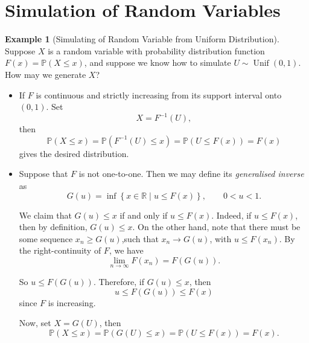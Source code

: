 \documentclass[11pt]{article}
\numberwithin{equation}{section}
\theoremstyle{definition}
\newtheorem{example}[theorem]{Example}
\theoremstyle{remark}
\newcommand{\pqty}[1]{\left(#1\right)}
\newcommand{\set}[2]{\left\{#1\mid #2\right\}}
\newcommand{\oointv}[2]{(#1,#2)}
\newcommand{\RR}{\mathbb R}
\newcommand{\inverse}{^{-1}}
\newcommand{\Prob}{\mathbb P}
\newcommand{\Uniform}{\operatorname{Unif}}
\begin{document}
\section{Simulation of Random Variables}\label{probability-section-15}

\begin{example}[Simulating of Random Variable from Uniform Distribution]\label{probability-example-046}
    \label{probability-ex:simulation-from-uniform}%
    Suppose \(X\) is a random variable with probability distribution function \(F\pqty{x} = \Prob\pqty{X \leq x}\), and suppose we know how to simulate \(U \sim \Uniform \oointv{0}{1}\). How may we generate \(X\)?

    \begin{itemize}
        \item If \(F\) is continuous and strictly increasing from its support interval onto \((0,1)\). Set
        \[
            X = F\inverse\pqty{U},
        \]
        then
        \[
            \Prob\pqty{X \leq x} = \Prob\pqty{F\inverse\pqty{U} \leq x} = \Prob\pqty{U \leq F\pqty{x}} = F\pqty{x}
        \]
        gives the desired distribution.

        \item Suppose that \(F\) is not one-to-one. Then we may define its \emph{generalised inverse} as
        \[
            G\pqty{u} = \inf \set{x \in \RR}{u \leq F\pqty{x}},\qquad 0<u<1.
        \]

        We claim that \(G\pqty{u} \leq x\) if and only if \(u \leq F\pqty{x}\). Indeed, if \(u \leq F\pqty{x}\), then by definition, \(G\pqty{u} \leq x\). On the other hand, note that there must be some sequence \(x_n \geq G\pqty{u}\),such that \(x_n \to G\pqty{u}\), with \(u \leq F\pqty{x_n}\). By the right-continuity of \(F\), we have
        \[
            \lim_{n \to \infty} F\pqty{x_n} = F\pqty{G\pqty{u}}.
        \]

        So \(u \leq F\pqty{G\pqty{u}}\). Therefore, if \(G\pqty{u} \leq x\), then
        \[
            u \leq F\pqty{G\pqty{u}} \leq F\pqty{x}
        \]
        since \(F\) is increasing.

        Now, set \(X = G\pqty{U}\), then
        \[
            \Prob\pqty{X \leq x} = \Prob\pqty{G\pqty{U} \leq x} = \Prob\pqty{U \leq F\pqty{x}} = F\pqty{x}.
        \]
    \end{itemize} 
\end{example}
\end{document}
